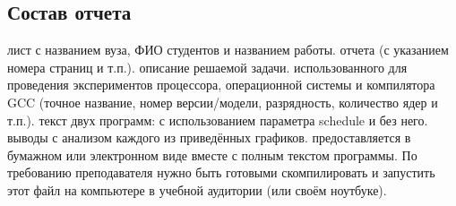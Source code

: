 { %
	\subsection{Состав отчета}
	\Large
	\begin{enumerate}
		 лист с названием вуза, ФИО студентов и названием работы.
		 отчета (с указанием номера страниц и т.п.).
		 описание решаемой задачи.
		 использованного для проведения экспериментов  процессора, операционной системы и компилятора GCC  (точное название, номер версии/модели, разрядность, количество ядер и т.п.).
		 текст двух программ: с использованием параметра schedule и без него.
		 выводы с анализом каждого из приведённых графиков.
		 предоставляется в бумажном или электронном виде вместе с полным текстом программы. По требованию преподавателя нужно быть готовыми скомпилировать и запустить этот файл на компьютере в учебной аудитории (или своём ноутбуке).
	\end{enumerate}
}